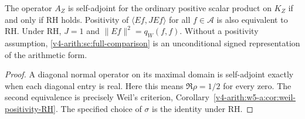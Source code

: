 \begin{corollary}
\label{v4-arith:sc:positivity-boundary}
The operator $A_Z$ is self-adjoint for the ordinary positive scalar
product on $K_Z$ if and only if RH holds.
Positivity of $\langle Ef,JEf\rangle$ for all $f\in\mathscr A$
is also equivalent to RH.
Under RH, $J=1$ and $\|Ef\|^2=q_W(f,f)$.
Without a positivity assumption, \eqref{v4-arith:sc:full-comparison}
is an unconditional signed representation of the arithmetic form.
\end{corollary}
\begin{proof}
A diagonal normal operator on its maximal domain is self-adjoint
exactly when each diagonal entry is real. Here this means
$\Re\rho=1/2$ for every zero. The second equivalence is precisely
Weil's criterion, Corollary~\ref{v4-arith:w5-a:cor:weil-positivity-RH}.
The specified choice of $\sigma$ is the identity under RH.
\end{proof}
